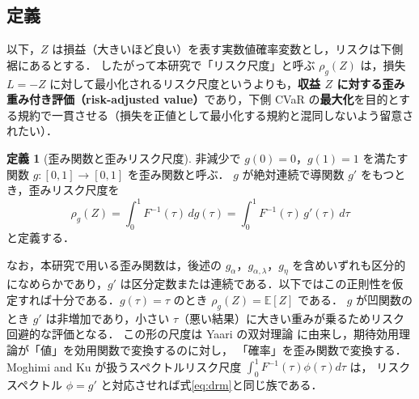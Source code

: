 \documentclass[a4paper,10pt]{jsarticle}
\theoremstyle{definition}
\newtheorem{definition}{定義}[section]
\newcommand{\Finv}{F^{-1}}
\newcommand{\E}{\mathbb{E}}
\begin{document}
\subsection{定義}
以下，$Z$ は損益（大きいほど良い）を表す実数値確率変数とし，リスクは下側裾にあるとする．
したがって本研究で「リスク尺度」と呼ぶ $\rho_g(Z)$ は，損失 $L=-Z$ に対して最小化されるリスク尺度というよりも，\textbf{収益 $Z$ に対する歪み重み付き評価（risk-adjusted value）}であり，下側 CVaR の\textbf{最大化}を目的とする規約で一貫させる（損失を正値として最小化する規約と混同しないよう留意されたい）．
\begin{definition}[歪み関数と歪みリスク尺度]
非減少で $g(0)=0$，$g(1)=1$ を満たす関数 $g:[0,1]\to[0,1]$ を歪み関数と呼ぶ．
$g$ が絶対連続で導関数 $g'$ をもつとき，歪みリスク尺度を
\begin{equation}
  \rho_g(Z)=\int_0^1\Finv(\tau)\,dg(\tau)=\int_0^1\Finv(\tau)\,g'(\tau)\,d\tau
  \label{eq:drm}
\end{equation}
と定義する．
\end{definition}
なお，本研究で用いる歪み関数は，後述の $g_\alpha$，$g_{\alpha,\lambda}$，$g_\eta$ を含めいずれも区分的になめらかであり，$g'$ は区分定数または連続である．以下ではこの正則性を仮定すれば十分である．$g(\tau)=\tau$ のとき $\rho_g(Z)=\E[Z]$ である．
$g$ が凹関数のとき $g'$ は非増加であり，小さい $\tau$（悪い結果）に大きい重みが乗るためリスク回避的な評価となる．
この形の尺度は Yaari の双対理論 \cite{yaari1987dual} に由来し，期待効用理論が「値」を効用関数で変換するのに対し，
「確率」を歪み関数で変換する．
Moghimi and Ku \cite{moghimi2025beyond} が扱うスペクトルリスク尺度 $\int_0^1\Finv(\tau)\phi(\tau)d\tau$ は，
リスクスペクトル $\phi=g'$ と対応させれば式\eqref{eq:drm}と同じ族である．
\end{document}

